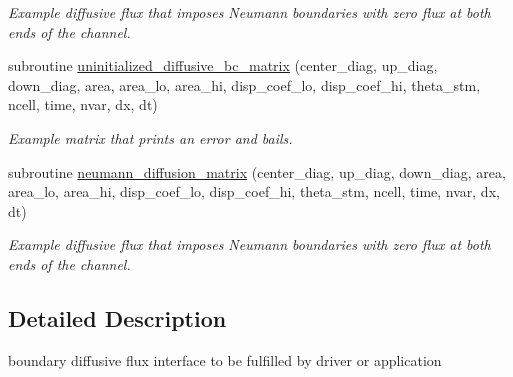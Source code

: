 \begin{CompactItemize}
\begin{CompactList}\small\item\em Example diffusive flux that imposes Neumann boundaries with zero flux at both ends of the channel. \item\end{CompactList}\item 
subroutine \hyperlink{a00051_6a67899a1c3944d943a1b2fb5aac2986}{uninitialized\_\-diffusive\_\-bc\_\-matrix} (center\_\-diag, up\_\-diag, down\_\-diag, area, area\_\-lo, area\_\-hi, disp\_\-coef\_\-lo, disp\_\-coef\_\-hi, theta\_\-stm, ncell, time, nvar, dx, dt)
\begin{CompactList}\small\item\em Example matrix that prints an error and bails. \item\end{CompactList}\item 
subroutine \hyperlink{a00051_35936f4856e0472bc61d1deef432ff3e}{neumann\_\-diffusion\_\-matrix} (center\_\-diag, up\_\-diag, down\_\-diag, area, area\_\-lo, area\_\-hi, disp\_\-coef\_\-lo, disp\_\-coef\_\-hi, theta\_\-stm, ncell, time, nvar, dx, dt)
\begin{CompactList}\small\item\em Example diffusive flux that imposes Neumann boundaries with zero flux at both ends of the channel. \item\end{CompactList}\end{CompactItemize}


\subsection{Detailed Description}
boundary diffusive flux interface to be fulfilled by driver or application 



